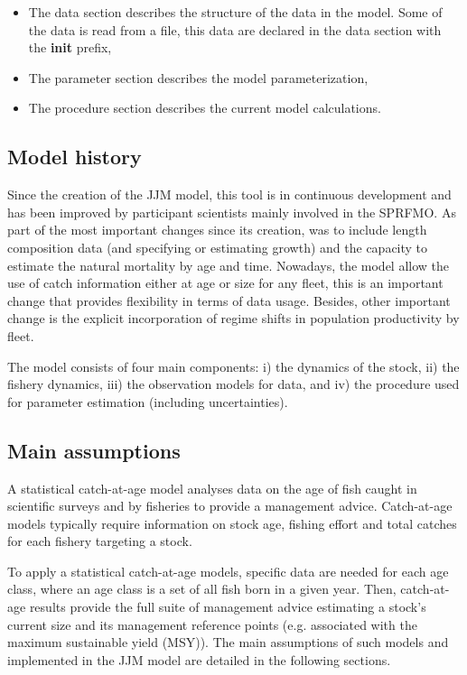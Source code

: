 \documentclass{article}
\begin{document}
\begin{itemize}
    \item The data section describes the structure of the data in the model. Some of the data is read from a file, this data are declared in the data section  with the  \textbf{init} prefix,
    \item The parameter section describes the model parameterization,
    \item The procedure section describes the current model calculations.
\end{itemize}





\subsection{Model history}
Since the creation of the JJM model, this tool is in continuous development and has been improved by participant scientists mainly involved in the SPRFMO. As part of the most important changes since its creation, was to include length composition data (and specifying or estimating growth) and the capacity to estimate the natural mortality by age and time. Nowadays, the model allow the use of catch information either at age or size for any fleet, this is an important change that provides flexibility in terms of data usage. Besides, other important change is the explicit incorporation of regime shifts in population productivity by fleet.

The model consists of four main components: i) the dynamics of the stock, ii) the fishery dynamics, iii) the observation models for data, and iv) the procedure used for parameter estimation (including uncertainties).

\subsection{Main assumptions}

A statistical catch-at-age model analyses data on the age of fish caught in scientific surveys and by fisheries to provide a management advice. Catch-at-age models typically require information on stock age, fishing effort and total catches for each fishery targeting a stock.

To apply a statistical catch-at-age models, specific data are needed for each age class, where an age class is a set of all fish born in a given year. Then, catch-at-age results provide the full suite of management advice estimating a stock's current size and its management reference points (e.g. associated with the maximum sustainable yield (MSY)). The main assumptions of such models and implemented in the JJM model are detailed in the following sections.
\end{document}
